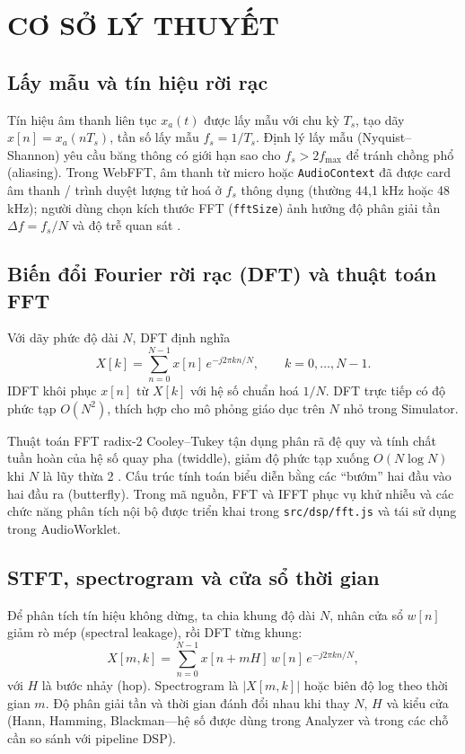 \pagestyle{fancy}
\chapter{CƠ SỞ LÝ THUYẾT}

\section{Lấy mẫu và tín hiệu rời rạc}
Tín hiệu âm thanh liên tục $x_a(t)$ được lấy mẫu với chu kỳ $T_s$, tạo dãy $x[n]=x_a(nT_s)$, tần số lấy mẫu $f_s=1/T_s$. Định lý lấy mẫu (Nyquist--Shannon) yêu cầu băng thông có giới hạn sao cho $f_s > 2 f_{\max}$ để tránh chồng phổ (aliasing). Trong WebFFT, âm thanh từ micro hoặc \texttt{AudioContext} đã được card âm thanh / trình duyệt lượng tử hoá ở $f_s$ thông dụng (thường 44,1 kHz hoặc 48 kHz); người dùng chọn kích thước FFT (\texttt{fftSize}) ảnh hưởng độ phân giải tần $\Delta f = f_s/N$ và độ trễ quan sát \cite{oppenheim}.

\section{Biến đổi Fourier rời rạc (DFT) và thuật toán FFT}
Với dãy phức độ dài $N$, DFT định nghĩa
\begin{equation}
	X[k]=\sum_{n=0}^{N-1} x[n]\, e^{-j 2\pi kn/N}, \qquad k=0,\ldots,N-1.
\end{equation}
IDFT khôi phục $x[n]$ từ $X[k]$ với hệ số chuẩn hoá $1/N$. DFT trực tiếp có độ phức tạp $O(N^2)$, thích hợp cho mô phỏng giáo dục trên $N$ nhỏ trong Simulator.

Thuật toán FFT radix-2 Cooley--Tukey tận dụng phân rã đệ quy và tính chất tuần hoàn của hệ số quay pha (twiddle), giảm độ phức tạp xuống $O(N\log N)$ khi $N$ là lũy thừa 2 \cite{cooleyJW}. Cấu trúc tính toán biểu diễn bằng các ``bướm'' hai đầu vào hai đầu ra (butterfly). Trong mã nguồn, FFT và IFFT phục vụ khử nhiễu và các chức năng phân tích nội bộ được triển khai trong \verb|src/dsp/fft.js| và tái sử dụng trong AudioWorklet.

\section{STFT, spectrogram và cửa sổ thời gian}
Để phân tích tín hiệu không dừng, ta chia khung độ dài $N$, nhân cửa sổ $w[n]$ giảm rò mép (spectral leakage), rồi DFT từng khung:
\begin{equation}
	X[m,k]=\sum_{n=0}^{N-1} x[n+mH]\, w[n]\, e^{-j 2\pi kn/N},
\end{equation}
với $H$ là bước nhảy (hop). Spectrogram là $|X[m,k]|$ hoặc biên độ log theo thời gian $m$. Độ phân giải tần và thời gian đánh đổi nhau khi thay $N$, $H$ và kiểu cửa (Hann, Hamming, Blackman---hệ số được dùng trong Analyzer và trong các chỗ cần so sánh với pipeline DSP).


